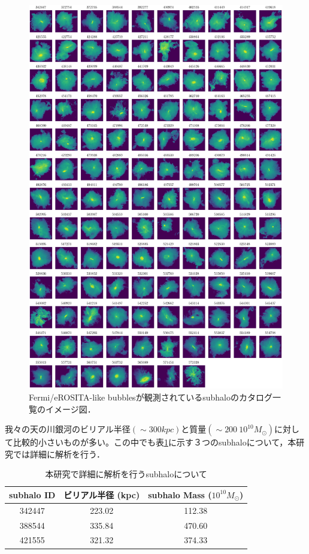 \begin{figure}[htbp]
	\centering
	\includegraphics[width=0.9\linewidth]{pic/eROSITAbubble_subhaloID}
	\caption{Fermi/eROSITA-like bubblesが観測されているsubhaloのカタログ一覧\citep{pillepich_x-ray_2021}のイメージ図．}
	\label{fig:erositabubblesubhaloid}
\end{figure}

我々の天の川銀河のビリアル半径$(\sim 300 \si{kpc})$と質量$(\sim 200 \ 10^{10} M_\odot)$に対して比較的小さいものが多い。この中でも表\ref{tab:subhalo_details}に示す３つのsubhaloについて，本研究では詳細に解析を行う．

\begin{table}[htbp]
	\centering
	\caption{本研究で詳細に解析を行うsubhaloについて}
	\label{tab:subhalo_details}
	\begin{tabular}{ccc}
		\toprule
		subhalo ID & ビリアル半径 (\si{kpc}) & subhalo Mass ($10^{10} M_\odot$)\\ \midrule
		342447     & 223.02       & 112.38       \\
		388544     & 335.84       & 470.60       \\
		421555     & 321.32       & 374.33       \\ \bottomrule
	\end{tabular}
\end{table}

